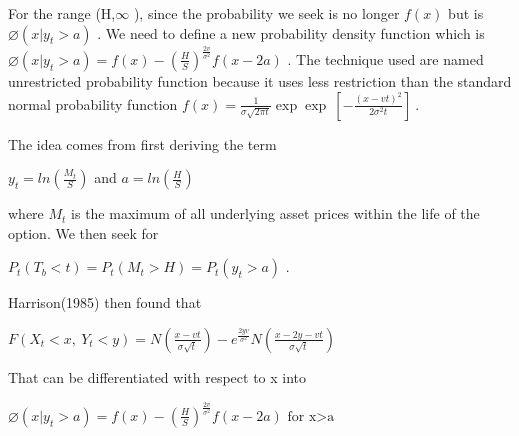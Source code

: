 \documentclass[12pt]{article}
\renewcommand{\_}{\kern-1.5pt\textunderscore\kern-1.5pt}
\begin{document}
For the range (H,$\infty$ ), since the probability we seek is no longer  \( f \left( x \right)  \)  but is\textbf{  \(  \varnothing  \left( x \vert y_{t}>a \right)  \) }. We need to define a new probability density function which is \textbf{  \(  \varnothing  \left( x \vert y_{t}>a \right) =f \left( x \right) - \left( \frac{H}{S} \right) ^{\frac{2v}{ \sigma ^{2}}}f \left( x-2a \right)  \) }. The technique used are named unrestricted probability function because it uses less restriction than the standard normal probability function  \( f \left( x \right) =\frac{1}{ \sigma \sqrt{2 \pi t}}\exp \exp ~ \left[ -\frac{ \left( x-vt \right) ^{2}}{2 \sigma ^{2}t} \right] ~. \)  \par

The idea comes from first deriving the term \par

\begin{Center}
 \( y_{t}=ln⁡ \left( \frac{M_{t}}{S} \right)  \)  and  \( a=ln⁡ \left( \frac{H}{S} \right)  \) 
\end{Center}\par

where  \( M_{t} \)  is the maximum of all underlying asset prices within the life of the option. We then seek for \par

\begin{Center}
 \( P_{t} \left( T_{b}<t \right) =P_{t} \left( M_{t}>H \right) =P_{t} \left( y_{t}>a \right)  \) .\ \  
\end{Center}\par

Harrison(1985) then found that\par

\begin{Center}
 \( F \left( X_{t}<x,~Y_{t}<y \right) =N \left( \frac{x-vt}{ \sigma \sqrt{t}} \right) -e^{\frac{2yv}{ \sigma ^{2}}}N \left( \frac{x-2y- vt}{ \sigma \sqrt{t}} \right)  \) 
\end{Center}\par

That can be differentiated with respect to x into\par

\begin{Center}
 \(  \varnothing  \left( x \vert y_{t}>a \right) =f \left( x \right) - \left( \frac{H}{S} \right) ^{\frac{2v}{ \sigma ^{2}}}f \left( x-2a \right) \text{ for x>a } \) 
\end{Center}\par
\end{document}
